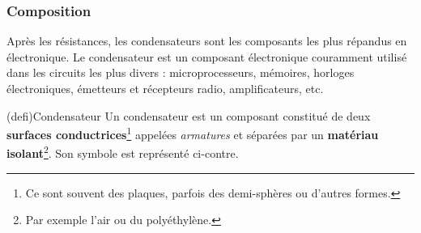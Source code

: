 \documentclass[../../main/main.tex]{subfiles}
\begin{document}
\subsubsection{Composition}

Après les résistances, les condensateurs sont les composants les plus répandus
en électronique. Le condensateur est un composant électronique couramment
utilisé dans les circuits les plus divers : microprocesseurs, mémoires, horloges
électroniques, émetteurs et récepteurs radio, amplificateurs, etc.

\begin{tcb*}[label=def:condens, sidebyside, righthand ratio=.3](defi){Condensateur}
	Un condensateur est un composant constitué de deux \textbf{surfaces
		conductrices}\footnote{Ce sont souvent des plaques, parfois des demi-sphères
		ou d'autres formes.} appelées \textit{armatures} et séparées par un
	\textbf{matériau isolant}\footnote{Par exemple l'air ou du polyéthylène.}.
	Son symbole est représenté ci-contre.
	\tcblower
	\begin{center}
	\end{center}
\end{tcb*}
\end{document}
